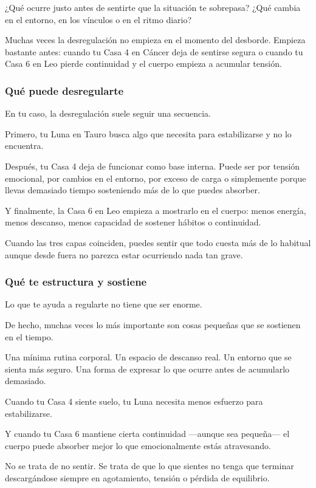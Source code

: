 \documentclass[11pt,a4paper]{article}
\begin{document}
¿Qué ocurre justo antes de sentirte que la situación te sobrepasa?
¿Qué cambia en el entorno, en los vínculos o en el ritmo diario?

Muchas veces la desregulación no empieza en el momento del desborde. Empieza bastante antes: cuando tu Casa 4 en Cáncer deja de sentirse segura o cuando tu Casa 6 en Leo pierde continuidad y el cuerpo empieza a acumular tensión.

\subsubsection*{Qué puede desregularte}

En tu caso, la desregulación suele seguir una secuencia.

Primero, tu Luna en Tauro busca algo que necesita para estabilizarse y no lo encuentra.

Después, tu Casa 4 deja de funcionar como base interna. Puede ser por tensión emocional, por cambios en el entorno, por exceso de carga o simplemente porque llevas demasiado tiempo sosteniendo más de lo que puedes absorber.

Y finalmente, la Casa 6 en Leo empieza a mostrarlo en el cuerpo:
menos energía,
menos descanso,
menos capacidad de sostener hábitos o continuidad.

Cuando las tres capas coinciden, puedes sentir que todo cuesta más de lo habitual aunque desde fuera no parezca estar ocurriendo nada tan grave.

\subsubsection*{Qué te estructura y sostiene}

Lo que te ayuda a regularte no tiene que ser enorme.

De hecho, muchas veces lo más importante son cosas pequeñas que se sostienen en el tiempo.

Una mínima rutina corporal.
Un espacio de descanso real.
Un entorno que se sienta más seguro.
Una forma de expresar lo que ocurre antes de acumularlo demasiado.

Cuando tu Casa 4 siente suelo, tu Luna necesita menos esfuerzo para estabilizarse.

Y cuando tu Casa 6 mantiene cierta continuidad —aunque sea pequeña— el cuerpo puede absorber mejor lo que emocionalmente estás atravesando.

No se trata de no sentir.
Se trata de que lo que sientes no tenga que terminar descargándose siempre en agotamiento, tensión o pérdida de equilibrio.
\end{document}
